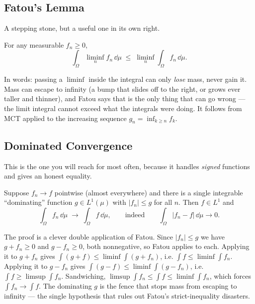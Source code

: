 \subsection{Fatou's Lemma}

A stepping stone, but a useful one in its own right.

\begin{lemma}[Fatou]
\label{ch37:thm-fatou}
For any measurable $f_n\ge 0$,
\[
  \int_\Omega \liminf_{n} f_n \,\dd\mu \;\le\; \liminf_{n} \int_\Omega
  f_n\,\dd\mu .
\]
\end{lemma}

In words: passing a $\liminf$ inside the integral can only \emph{lose} mass,
never gain it. Mass can escape to infinity (a bump that slides off to the right,
or grows ever taller and thinner), and Fatou says that is the only thing that
can go wrong --- the limit integral cannot exceed what the integrals were doing.
It follows from MCT applied to the increasing sequence $g_n=\inf_{k\ge n}f_k$.

\subsection{Dominated Convergence}

This is the one you will reach for most often, because it handles
\emph{signed} functions and gives an honest equality.

\begin{theorem}
\label{ch37:thm-dct}
Suppose $f_n\to f$ pointwise (almost everywhere) and there is a single
integrable ``dominating'' function $g\in L^1(\mu)$ with $|f_n|\le g$ for all
$n$. Then $f\in L^1$ and
\[
  \int_\Omega f_n\,\dd\mu \;\longrightarrow\; \int_\Omega f\,\dd\mu,
  \qquad\text{indeed}\qquad
  \int_\Omega |f_n - f|\,\dd\mu \to 0 .
\]
\end{theorem}

\begin{whybox}
The proof is a clever double application of Fatou. Since $|f_n|\le g$ we have
$g+f_n\ge 0$ and $g-f_n\ge 0$, both nonnegative, so Fatou applies to each.
Applying it to $g+f_n$ gives $\int(g+f)\le\liminf\int(g+f_n)$, i.e. $\int f \le
\liminf\int f_n$. Applying it to $g-f_n$ gives $\int(g-f)\le\liminf\int(g-f_n)$,
i.e. $\int f \ge \limsup\int f_n$. Sandwiching, $\limsup\int f_n \le \int f \le
\liminf\int f_n$, which forces $\int f_n\to\int f$. The dominating $g$ is the
fence that stops mass from escaping to infinity --- the single hypothesis that
rules out Fatou's strict-inequality disasters.
\end{whybox}

